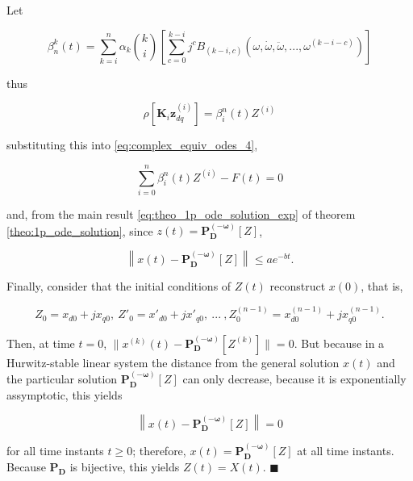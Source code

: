 	Let

\begin{equation} \beta_n^k(t) = \sum\limits_{k=i}^{n} \alpha_k{k\choose i}\left[ \sum\limits_{c=0}^{k-i} j^c B_{\left(k-i,c\right)}\left(\omega,\dot{\omega},\ddot{\omega},...,\omega^{(k-i-c)}\right)\right] \label{eq:complex_equiv_odes_6}\end{equation}

	\noindent thus 

\begin{equation} \rho\left[\mathbf{K}_i\mathbf{z}^{(i)}_{dq}\right] = \beta_i^n(t) Z^{(i)}\end{equation}

	\noindent substituting this into \eqref{eq:complex_equiv_odes_4},

\begin{equation} \sum\limits_{i=0}^n \beta_i^n(t) Z^{(i)} - F(t) = 0 \end{equation}

	\noindent and, from the main result \eqref{eq:theo_1p_ode_solution_exp} of theorem \ref{theo:1p_ode_solution}, since $z(t) = \mathbf{P_D^{\left(-\omega\right)}}\left[Z\right]$,

\begin{equation} \left\lVert x(t) - \mathbf{P_D^{\left(-\omega\right)}}\left[Z\right] \right\rVert \leq ae^{-bt} .\end{equation} 

	Finally, consider that the initial conditions of $Z(t)$ reconstruct $x(0)$, that is,

\begin{equation} Z_0 = x_{d0} + jx_{q0},\ Z'_0 = x'_{d0} + jx'_{q0},\ ...\ ,Z^{(n-1)}_0 = x^{(n-1)}_{d0} + jx^{(n-1)}_{q0}. \end{equation}

	Then, at time $t = 0$, $\lVert x^{(k)}(t) - \mathbf{P_D^{\left(-\omega\right)}}\left[Z^{(k)}\right] \rVert = 0$. But because in a Hurwitz-stable linear system the distance from the general solution $x(t)$ and the particular solution $\mathbf{P_D^{\left(-\omega\right)}}\left[Z\right] $ can only decrease, because it is exponentially assymptotic, this yields

\begin{equation} \left\lVert x(t) - \mathbf{P_D^{\left(-\omega\right)}}\left[Z\right] \right\rVert  = 0 \end{equation} 

	\noindent for all time instants $t\geq 0$; therefore, $x(t) = \mathbf{P_D^{\left(-\omega\right)}}\left[Z\right]$ at all time instants. Because $\mathbf{P_D}$ is bijective, this yields $Z(t) = X(t)$. \hfill$\blacksquare$

